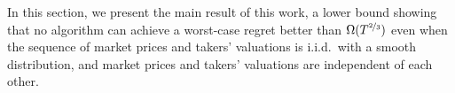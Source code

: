 \documentclass[final,12pt]{colt2025}
\newcommand{\cO}{\mathcal{O}}
\newcommand{\nb}{b}
\newcommand{\ns}{a}
\begin{document}



In this section, we present the main result of this work, a lower bound showing that no algorithm can achieve a worst-case regret better than $\Omega(T^{\nicefrac{2}{3}})$ even when the sequence of market prices and takers' valuations is i.i.d.\ with a smooth distribution, and market prices and takers' valuations are independent of each other.
\end{document}
